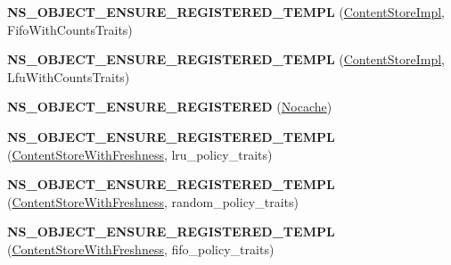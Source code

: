 \begin{DoxyCompactItemize}
\item 
{\bfseries N\+S\+\_\+\+O\+B\+J\+E\+C\+T\+\_\+\+E\+N\+S\+U\+R\+E\+\_\+\+R\+E\+G\+I\+S\+T\+E\+R\+E\+D\+\_\+\+T\+E\+M\+PL} (\hyperlink{classns3_1_1ndn_1_1cs_1_1ContentStoreImpl}{Content\+Store\+Impl}, Fifo\+With\+Counts\+Traits)\hypertarget{namespacens3_1_1ndn_1_1cs_a8d1b313fa17194a07497637e9076286b}{}\label{namespacens3_1_1ndn_1_1cs_a8d1b313fa17194a07497637e9076286b}

\item 
{\bfseries N\+S\+\_\+\+O\+B\+J\+E\+C\+T\+\_\+\+E\+N\+S\+U\+R\+E\+\_\+\+R\+E\+G\+I\+S\+T\+E\+R\+E\+D\+\_\+\+T\+E\+M\+PL} (\hyperlink{classns3_1_1ndn_1_1cs_1_1ContentStoreImpl}{Content\+Store\+Impl}, Lfu\+With\+Counts\+Traits)\hypertarget{namespacens3_1_1ndn_1_1cs_ad452404849d30d27cf7e6df36bc27644}{}\label{namespacens3_1_1ndn_1_1cs_ad452404849d30d27cf7e6df36bc27644}

\item 
{\bfseries N\+S\+\_\+\+O\+B\+J\+E\+C\+T\+\_\+\+E\+N\+S\+U\+R\+E\+\_\+\+R\+E\+G\+I\+S\+T\+E\+R\+ED} (\hyperlink{classns3_1_1ndn_1_1cs_1_1Nocache}{Nocache})\hypertarget{namespacens3_1_1ndn_1_1cs_a72ff638d4081e49e6025a39b9c2c7e75}{}\label{namespacens3_1_1ndn_1_1cs_a72ff638d4081e49e6025a39b9c2c7e75}

\item 
{\bfseries N\+S\+\_\+\+O\+B\+J\+E\+C\+T\+\_\+\+E\+N\+S\+U\+R\+E\+\_\+\+R\+E\+G\+I\+S\+T\+E\+R\+E\+D\+\_\+\+T\+E\+M\+PL} (\hyperlink{classns3_1_1ndn_1_1cs_1_1ContentStoreWithFreshness}{Content\+Store\+With\+Freshness}, lru\+\_\+policy\+\_\+traits)\hypertarget{namespacens3_1_1ndn_1_1cs_a6f59a73403ef88030f04d87df506f60e}{}\label{namespacens3_1_1ndn_1_1cs_a6f59a73403ef88030f04d87df506f60e}

\item 
{\bfseries N\+S\+\_\+\+O\+B\+J\+E\+C\+T\+\_\+\+E\+N\+S\+U\+R\+E\+\_\+\+R\+E\+G\+I\+S\+T\+E\+R\+E\+D\+\_\+\+T\+E\+M\+PL} (\hyperlink{classns3_1_1ndn_1_1cs_1_1ContentStoreWithFreshness}{Content\+Store\+With\+Freshness}, random\+\_\+policy\+\_\+traits)\hypertarget{namespacens3_1_1ndn_1_1cs_ac7861df9512d38307ba7c3040761d503}{}\label{namespacens3_1_1ndn_1_1cs_ac7861df9512d38307ba7c3040761d503}

\item 
{\bfseries N\+S\+\_\+\+O\+B\+J\+E\+C\+T\+\_\+\+E\+N\+S\+U\+R\+E\+\_\+\+R\+E\+G\+I\+S\+T\+E\+R\+E\+D\+\_\+\+T\+E\+M\+PL} (\hyperlink{classns3_1_1ndn_1_1cs_1_1ContentStoreWithFreshness}{Content\+Store\+With\+Freshness}, fifo\+\_\+policy\+\_\+traits)\hypertarget{namespacens3_1_1ndn_1_1cs_adb8f7b4b7fcae00c7e4fa9b4107f34d6}{}\label{namespacens3_1_1ndn_1_1cs_adb8f7b4b7fcae00c7e4fa9b4107f34d6}


\end{DoxyCompactItemize}
